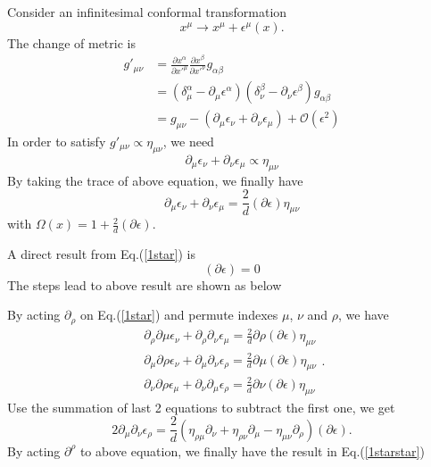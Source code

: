 \documentclass[a4paper,11pt]{article}
\begin{document}
Consider an infinitesimal conformal transformation
\begin{equation}
    x^\mu\rightarrow x^\mu+\epsilon^\mu(x).
\end{equation}
The change of metric is
\begin{equation}
\begin{aligned}
g'_{\mu\nu}&=\frac{\partial x^\alpha}{\partial x'^\mu}\frac{\partial x^\beta}{\partial x'^\nu}g_{\alpha\beta}\\
&=(\delta^\alpha_\mu-\partial_\mu\epsilon^\alpha)(\delta^\beta_\nu-\partial_\nu\epsilon^\beta)g_{\alpha\beta}\\
&=g_{\mu\nu}-(\partial_\mu\epsilon_\nu+\partial_\nu\epsilon_\mu)+\mathcal{O}(\epsilon^2)
\end{aligned}
\end{equation}
In order to satisfy $g'_{\mu\nu}\propto\eta_{\mu\nu}$, we need
\begin{equation}
    \partial_\mu\epsilon_\nu+\partial_\nu\epsilon_\mu\propto\eta_{\mu\nu}
\end{equation}
By taking the trace of above equation, we finally have
\begin{equation}
    \partial_\mu\epsilon_\nu+\partial_\nu\epsilon_\mu=\frac{2}{d}(\partial\epsilon)\eta_{\mu\nu}
    \label{1star}
\end{equation}
with $\Omega(x)=1+\frac{2}{d}(\partial\epsilon)$.

A direct result from Eq.(\ref{1star}) is 
\begin{equation}
    [\eta_{\mu\nu}\Box+(d-2)\partial_\mu\partial_\nu](\partial\epsilon)=0
    \label{1starstar}
\end{equation}
The steps lead to above result are shown as below


\begin{framed}
By acting $\partial_\rho$ on Eq.(\ref{1star}) and permute indexes $\mu$, $\nu$ and $\rho$, we have
\begin{equation}
\begin{aligned}
\partial_\rho\partial\mu\epsilon_\nu+\partial_\rho\partial_\nu\epsilon_\mu=\frac{2}{d}\partial\rho(\partial\epsilon)\eta_{\mu\nu}\\
\partial_\mu\partial\rho\epsilon_\nu+\partial_\mu\partial_\nu\epsilon_\rho=\frac{2}{d}\partial\mu(\partial\epsilon)\eta_{\mu\nu}\\
\partial_\nu\partial\rho\epsilon_\mu+\partial_\nu\partial_\mu\epsilon_\rho=\frac{2}{d}\partial\nu(\partial\epsilon)\eta_{\mu\nu}
\end{aligned}.
\end{equation}
Use the summation of last 2 equations to subtract the first one, we get
\begin{equation}
    2\partial_\mu\partial_\nu\epsilon_\rho=\frac{2}{d}(\eta_{\rho\mu}\partial_\nu+\eta_{\rho\nu}\partial_\mu-\eta_{\mu\nu}\partial_\rho)(\partial\epsilon).
\end{equation}
By acting $\partial^\rho$ to above equation, we finally have the result in Eq.(\ref{1starstar})
\end{framed}
\end{document}
